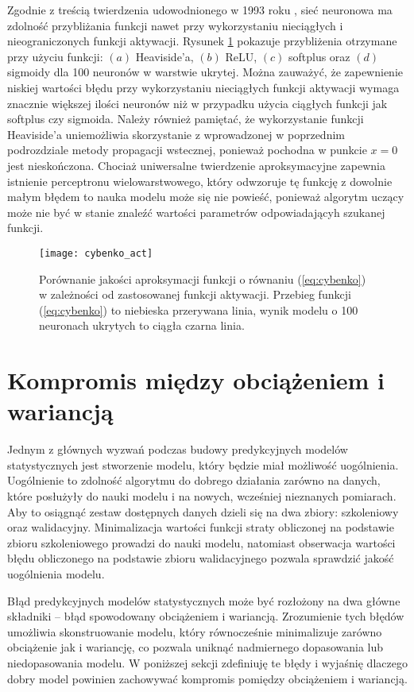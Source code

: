 \documentclass[11pt]{book}
\theoremstyle{definition}
\begin{document}
Zgodnie z treścią twierdzenia udowodnionego w 1993 roku \cite{Leshno1993MultilayerFN}, sieć neuronowa ma zdolność przybliżania funkcji nawet przy wykorzystaniu nieciągłych i nieograniczonych funkcji aktywacji. Rysunek \ref{fig:cybenko3} pokazuje przybliżenia otrzymane przy użyciu funkcji: $(a)$ Heaviside'a, $(b)$ ReLU, $(c)$ softplus oraz $(d)$ sigmoidy dla 100 neuronów w warstwie ukrytej. Można zauważyć, że zapewnienie niskiej wartości błędu przy wykorzystaniu nieciągłych funkcji aktywacji wymaga znacznie większej ilości neuronów niż w przypadku użycia ciągłych funkcji jak softplus czy sigmoida. Należy również pamiętać, że wykorzystanie funkcji Heaviside'a uniemożliwia skorzystanie z wprowadzonej w poprzednim podrozdziale metody propagacji wstecznej, ponieważ pochodna w punkcie $x=0$ jest nieskończona. Chociaż uniwersalne twierdzenie aproksymacyjne zapewnia istnienie perceptronu wielowarstwowego, który odwzoruje tę funkcję z dowolnie małym błędem to nauka modelu może się nie powieść, ponieważ algorytm uczący może nie być w stanie znaleźć wartości parametrów odpowiadającyh szukanej funkcji. 
%	
\begin{figure}[h!]
	\centering
	\texttt{[image: cybenko\_act]}
	\caption{Porównanie jakości aproksymacji funkcji o równaniu (\ref{eq:cybenko}) w zależności od zastosowanej funkcji aktywacji. Przebieg funkcji (\ref{eq:cybenko}) to niebieska przerywana linia, wynik modelu o 100 neuronach ukrytych to ciągła czarna linia.}
		 \label{fig:cybenko3}
\end{figure}

\section{Kompromis między obciążeniem i wariancją}
\label{biasvar}
Jednym z głównych wyzwań podczas budowy predykcyjnych modelów statystycznych jest stworzenie modelu, który będzie miał możliwość uogólnienia. Uogólnienie to zdolność algorytmu do dobrego działania zarówno na danych, które posłużyły do nauki modelu i na nowych, wcześniej nieznanych pomiarach. Aby to osiągnąć zestaw dostępnych danych dzieli się na dwa zbiory: szkoleniowy oraz walidacyjny. Minimalizacja wartości funkcji straty obliczonej na podstawie zbioru szkoleniowego prowadzi do nauki modelu, natomiast obserwacja wartości błędu obliczonego na podstawie zbioru walidacyjnego pozwala sprawdzić jakość uogólnienia modelu.

Błąd predykcyjnych modelów statystycznych może być rozłożony na dwa główne składniki -- błąd spowodowany obciążeniem i wariancją. Zrozumienie tych błędów umożliwia skonstruowanie modelu, który równocześnie minimalizuje zarówno obciążenie jak i wariancję, co pozwala uniknąć nadmiernego dopasowania lub niedopasowania modelu. W poniższej sekcji zdefiniuję te błędy i wyjaśnię dlaczego dobry model powinien zachowywać kompromis pomiędzy obciążeniem i wariancją.
\end{document}
